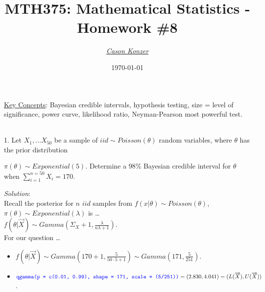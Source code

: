 \documentclass[12pt]{article}
\newcommand{\XB}{\color{black}}
\newcommand{\XBB}{\color{blue}}
\newcommand{\XV}{\color{violet}}
\newcommand{\ds}{\displaystyle}
\begin{document}
\title{\textbf{MTH375}: Mathematical Statistics - Homework \#8}
\date{\today}
\author{\XV\textit{\large{\href{https://github.com/casonk}{Cason Konzer}}}\XB}

\maketitle
\hrulefill
\vfill
    \underline{Key Concepts}: Bayesian credible intervals, hypothesis testing, size = level of significance,
    power curve, likelihood ratio, Neyman-Pearson most powerful test.

\newpage
\newpage
\XBB\hrulefill\XB \\

1. Let $ \ds X_{1}, \dots X_{50} $ be a sample of $ iid \sim Poisson(\theta) $ random variables,
where $ \theta $ has the prior distribution

$ \pi(\theta) \sim Exponential(5) $.
Determine a $ 98\% $ Bayesian credible interval for $ \theta $ when $ \ds \sum_{i=1}^{n=50} X_{i} = 170 $. \\

\XBB\hrulefill\XB
\vspace{5mm}

\vspace{2.5mm}
\textit{Solution}:
\vspace{2.5mm} \\

\noindent
Recall the posterior for $ n $ $ iid $ samples from $ f(x | \theta) \sim Poisson(\theta) $, $ \pi(\theta) \sim Exponential(\lambda) $ is \dots \\

$ \ds f(\theta | \overrightarrow{X}) \sim Gamma( \Sigma_{X} + 1, \frac{\lambda}{n\lambda + 1} ) $. \\

\noindent
For our question \dots

\begin{itemize}
    \item $ \ds f(\theta | \overrightarrow{X}) \sim Gamma( 170 + 1, \frac{5}{50 \cdot 5 + 1} ) \sim Gamma( 171, \frac{5}{251} ) $.
    \item $ \ds {\XBB \texttt{qgamma(p = c(0.01, 0.99), shape = 171, scale = (5/251))}} = (2.830, 4.041) = (L(\overrightarrow{X}),U(\overrightarrow{X})) $.
\end{itemize}
\end{document}
